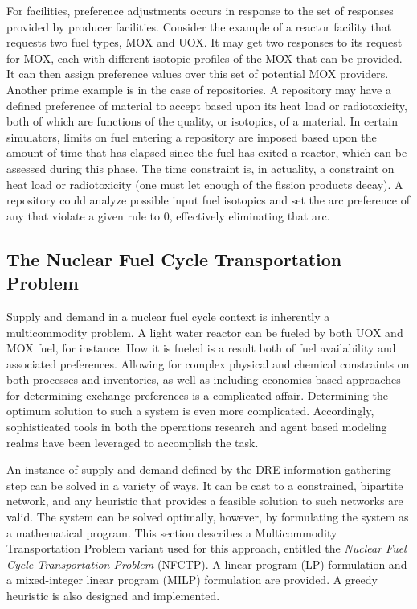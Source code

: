 For facilities, preference adjustments occurs in response to the set of
responses provided by producer facilities. Consider the example of a reactor
facility that requests two fuel types, MOX and UOX. It may get two responses to
its request for MOX, each with different isotopic profiles of the MOX that can
be provided. It can then assign preference values over this set of potential MOX
providers. Another prime example is in the case of repositories. A repository
may have a defined preference of material to accept based upon its heat load or
radiotoxicity, both of which are functions of the quality, or isotopics, of a
material. In certain simulators, limits on fuel entering a repository are
imposed based upon the amount of time that has elapsed since the fuel has exited
a reactor, which can be assessed during this phase. The time constraint is, in
actuality, a constraint on heat load or radiotoxicity (one must let enough of
the fission products decay). A repository could analyze possible input fuel
isotopics and set the arc preference of any that violate a given rule to 0,
effectively eliminating that arc.

\subsection{The Nuclear Fuel Cycle Transportation Problem}\label{abm:dre:fctp}

Supply and demand in a nuclear fuel cycle context is inherently a multicommodity
problem. A light water reactor can be fueled by both UOX and MOX fuel, for
instance. How it is fueled is a result both of fuel availability and associated
preferences. Allowing for complex physical and chemical constraints on both
processes and inventories, as well as including economics-based approaches for
determining exchange preferences is a complicated affair. Determining the
optimum solution to such a system is even more complicated. Accordingly,
sophisticated tools in both the operations research and agent based modeling
realms have been leveraged to accomplish the task.

An instance of supply and demand defined by the DRE information gathering step
can be solved in a variety of ways. It can be cast to a constrained, bipartite
network, and any heuristic that provides a feasible solution to such networks
are valid. The system can be solved optimally, however, by formulating the
system as a mathematical program. This section describes a Multicommodity
Transportation Problem variant used for this approach, entitled the
\textit{Nuclear Fuel Cycle Transportation Problem} (NFCTP). A linear program
(LP) formulation and a mixed-integer linear program (MILP) formulation are
provided. A greedy heuristic is also designed and implemented.

